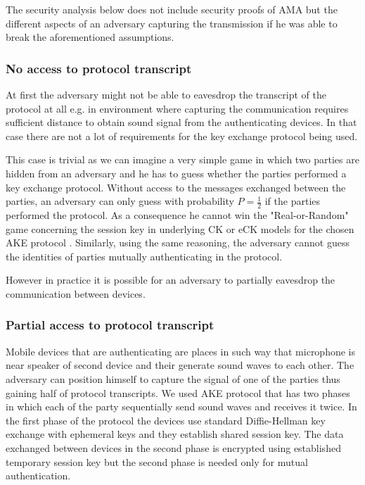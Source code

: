 \documentclass[11pt,titlepage]{article}
\theoremstyle{plain}
\begin{document}
\vspace{5mm}

The security analysis below does not include security proofs of AMA but the different aspects of an adversary capturing the transmission if he was able to break the aforementioned assumptions.

\subsubsection{No access to protocol transcript}
At first the adversary might not be able to eavesdrop the transcript of the protocol at all e.g. in environment where capturing the communication requires sufficient distance to obtain sound signal from the authenticating devices. In that case there are not a lot of requirements for the key exchange protocol being used.

\vspace{5mm}

This case is trivial as we can imagine a very simple game in which two parties are hidden from an adversary and he has to guess whether the parties performed a key exchange protocol. Without access to the messages exchanged between the parties, an adversary can only guess with probability $P = \frac{1}{2}$ if the parties performed the protocol. As a consequence he cannot win the "Real-or-Random" game concerning the session key in underlying CK or eCK models for the chosen AKE protocol \cite{key_exchange, efficient_eck, security_canetti_krawczyk}. Similarly, using the same reasoning, the adversary cannot guess the identities of parties mutually authenticating in the protocol. 

\vspace{5mm}

However in practice it is possible for an adversary to partially eavesdrop the communication between devices.

\subsubsection{Partial access to protocol transcript}

Mobile devices that are authenticating are places in such way that microphone is near speaker of second device and their generate sound waves to each other. The adversary can position himself to capture the signal of one of the parties thus gaining half of protocol transcripts. We used AKE protocol that has two phases in which each of the party sequentially send sound waves and receives it twice. In the first phase of the protocol the devices use standard Diffie-Hellman key exchange with ephemeral keys and they establish shared session key. The data exchanged between devices in the second phase is encrypted using established temporary session key but the second phase is needed only for mutual authentication. 
\end{document}
